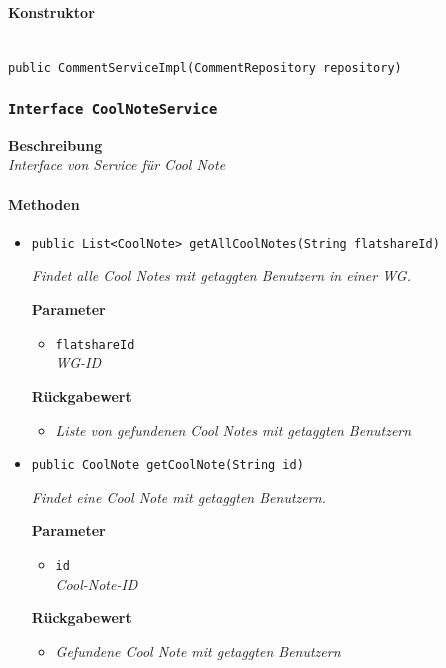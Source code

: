      \paragraph*{Konstruktor}\mbox{} \\
     \texttt{public CommentServiceImpl(CommentRepository repository)}
     \subsubsection{\texttt{Interface CoolNoteService}}
     \textbf{Beschreibung} \\
     \textit{Interface von Service für Cool Note}
     \paragraph*{Methoden}
     \begin{itemize}
     	\item{\texttt{public List<CoolNote> getAllCoolNotes(String flatshareId)}}
     	
     	\textit{Findet alle Cool Notes mit getaggten Benutzern in einer WG.}
     	
     	\textbf{Parameter}
     	\begin{itemize}
     		\item\texttt{flatshareId}\\
     		\textit{WG-ID}
     	\end{itemize}
     	
     	\textbf{Rückgabewert}
     	\begin{itemize}
     		\item\textit{Liste von gefundenen Cool Notes mit getaggten Benutzern}
     	\end{itemize}
     
     \item{\texttt{public CoolNote getCoolNote(String id)}}
     	
     	\textit{Findet eine Cool Note mit getaggten Benutzern.}
     	
     	\textbf{Parameter}
     	\begin{itemize}
     		\item\texttt{id}\\
     		\textit{Cool-Note-ID}
     	\end{itemize}
     
     	\textbf{Rückgabewert}
     	\begin{itemize}
     		\item\textit{Gefundene Cool Note mit getaggten Benutzern}
     	\end{itemize}
     

\end{itemize}
